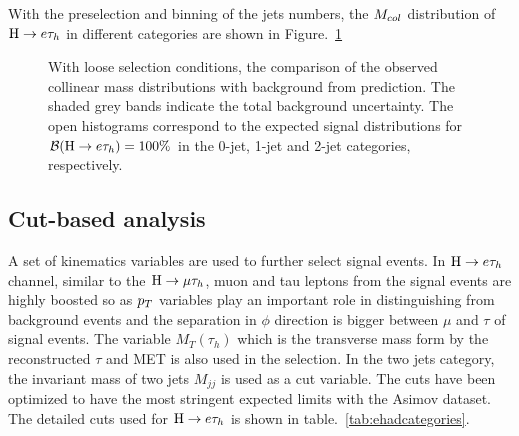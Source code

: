 With the preselection and binning of the jets numbers, the $M_{col}$ distribution of $\mathrm{H} \to e \tau_{h}$ in different categories are shown in Figure.~\ref{fig:etauCol_preselection}
\begin{figure}[hbtp]\centering
 \caption{With loose selection conditions, the comparison of the observed collinear mass distributions with background from prediction. The shaded grey bands indicate the total background uncertainty.
The open histograms correspond to the expected signal distributions for $\mathcal{B}(\mathrm{H} \to e \tau_{h})=100\%$ in the  0-jet, 1-jet and 2-jet categories, respectively.}
\label{fig:etauCol_preselection}\end{figure}


\subsection{Cut-based analysis}
A set of kinematics variables are used to further select signal events. In $\mathrm{H} \to e \tau_{h}$ channel, similar to the $\mathrm{H}\to \mu\tau_{h}$, muon and tau leptons from the signal events are highly boosted so as $p_{T}$ variables play an important role in distinguishing from background events and the separation in $\phi$ direction is bigger between $\mu$ and $\tau$ of signal events. The variable $M_{T}(\tau_{h})$ which is the transverse mass form by the reconstructed $\tau$ and MET is also used in the selection. In the two jets category, the invariant mass of two jets $M_{jj}$ is used as a cut variable.  The cuts have been optimized to have the most stringent expected limits with the Asimov dataset. The detailed cuts used for $\mathrm{H} \to e \tau_{h}$ is shown in table.~\ref{tab:ehadcategories}.


